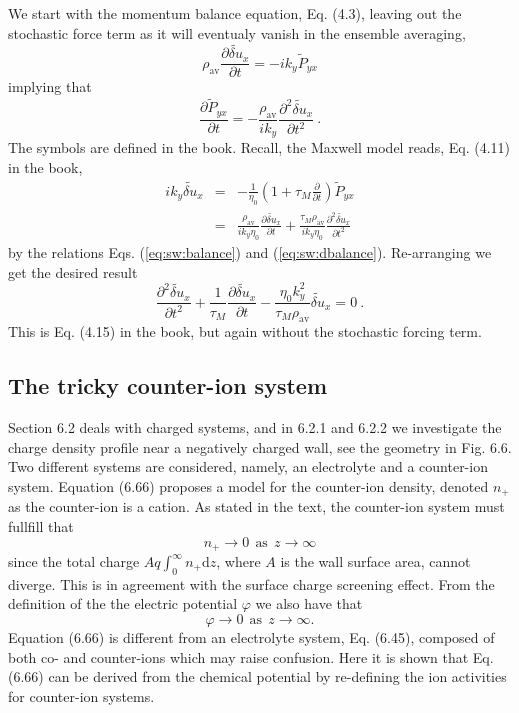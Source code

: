 \documentclass[11pt]{article}
\renewcommand{\d}{\mathrm{d}}
\begin{document}
We start with the momentum balance equation, Eq. (4.3), leaving out the stochastic force term as it will eventualy vanish in the ensemble 
averaging, 
\begin{equation}
	\label{eq:sw:balance}
	\rho_\text{av} \frac{\partial \widetilde{\delta u}_x}{\partial t} = -ik_y \widetilde{P}_{yx}
\end{equation}
implying that
\begin{equation}
	\label{eq:sw:dbalance}
	\frac{\partial \widetilde{P}_{yx}}{\partial t} = - \frac{\rho_\text{av}}{i k_y}\frac{\partial^2 \widetilde{\delta u}_x}{\partial t^2} \ .
\end{equation}
The symbols are defined in the book. Recall, the Maxwell model reads, Eq. (4.11) in the book,
\begin{eqnarray}
	ik_y \widetilde{\delta u}_x &=& - \frac{1}{\eta_0} \left(1 + \tau_M \frac{\partial}{\partial t}\right) \widetilde{P}_{yx} \\
	&=& \frac{\rho_\text{av}}{i k_y\eta_0} \frac{\partial \widetilde{\delta u}_x}{\partial t} 
	+ \frac{\tau_M \rho_\text{av}}{ik_y\eta_0}\frac{\partial^2\widetilde{\delta u}_x}{\partial t^2} 
\end{eqnarray}
by the relations Eqs. (\ref{eq:sw:balance}) and (\ref{eq:sw:dbalance}). Re-arranging we get the desired 
result
\begin{equation}
	\frac{\partial^2\widetilde{\delta u}_x}{\partial t^2} + \frac{1}{\tau_M} \frac{\partial \widetilde{\delta u}_x}{\partial t} - 
	\frac{\eta_0 k_y^2}{\tau_M \rho_\text{av}} \widetilde{\delta u}_x = 0 \ .
\end{equation}
This is Eq. (4.15) in the book, but again without the stochastic forcing term.

\subsection*{The tricky counter-ion system}
Section 6.2 deals with charged systems, and in 6.2.1 and 6.2.2 we investigate the 
charge density profile near a negatively charged wall, see the geometry in Fig. 6.6. 
Two different systems are considered, namely, an electrolyte and a counter-ion system. 
Equation (6.66) proposes a model for the counter-ion density, denoted $n_+$ as the counter-ion is 
a cation. As stated in the text, the counter-ion system must fullfill that
\begin{equation}
\label{eq:tc:n+zero}	
	n_+ \rightarrow 0 \ \ \text{as} \ \ z \rightarrow \infty
\end{equation}
since the total charge $A q\int_0^\infty n_+ \d z$, where $A$ is the wall surface area, cannot 
diverge. This is in agreement with the surface charge screening effect. From the definition of the 
the electric potential $\varphi$ we also have that  
\begin{equation}
\label{eq:tc:potential}
 \varphi \rightarrow 0 \ \ \text{as} \ \ z \rightarrow \infty.
\end{equation}
Equation (6.66) is different from an electrolyte system, Eq. (6.45), composed of both co- and 
counter-ions which may raise confusion. Here it is shown that Eq. (6.66) can be derived from the 
chemical potential by re-defining the ion activities for counter-ion systems.
\end{document}
